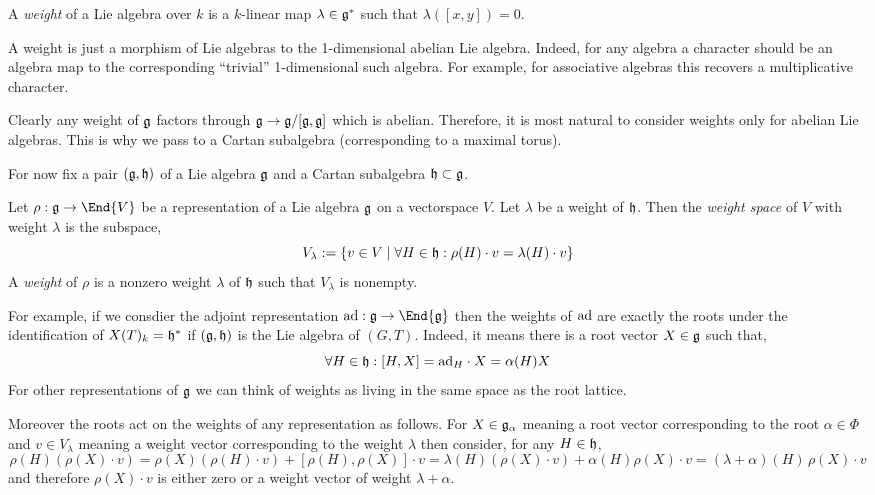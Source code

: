 \documentclass[12pt]{article}
\begin{document}
\begin{defn}
A \textit{weight} of a Lie algebra over $k$ is a $k$-linear map $\lambda \in \mathfrak{g}^*$ such that $\lambda([x,y]) = 0$. 
\end{defn}

\begin{rmk}
A weight is just a morphism of Lie algebras to the 1-dimensional abelian Lie algebra. Indeed, for any algebra a character should be an algebra map to the corresponding ``trivial'' 1-dimensional such algebra. For example, for associative algebras this recovers a multiplicative character.
\end{rmk}

\begin{rmk}
Clearly any weight of $\mathfrak{g}$ factors through $\mathfrak{g} \to \mathfrak{g} / [\mathfrak{g}, \mathfrak{g}]$ which is abelian. Therefore, it is most natural to consider weights only for abelian Lie algebras. This is why we pass to a Cartan subalgebra (corresponding to a maximal torus). 
\end{rmk}

For now fix a pair $(\mathfrak{g}, \mathfrak{h})$ of a Lie algebra $\mathfrak{g}$ and a Cartan subalgebra $\mathfrak{h} \subset \mathfrak{g}$.

\begin{defn}
Let $\rho : \g \to \End{V}$ be a representation of a Lie algebra $\mathfrak{g}$ on a vectorspace $V$. Let $\lambda$ be a weight of $\mathfrak{h}$. Then the \textit{weight space} of $V$ with weight $\lambda$ is the subspace,
\[ V_\lambda := \{ v \in V \mid \forall H \in \mathfrak{h} : \rho(H) \cdot v = \lambda(H) \cdot v \} \]
A \textit{weight} of $\rho$ is a nonzero weight $\lambda$ of $\mathfrak{h}$ such that $V_{\lambda}$ is nonempty.
\end{defn}

For example, if we consdier the adjoint representation $\ad : \g \to \End{\g}$ then the weights of $\mathrm{ad}$ are exactly the roots under the identification of $X(T)_k = \mathfrak{h}^*$ if $(\mathfrak{g}, \mathfrak{h})$ is the Lie algebra of $(G, T)$. Indeed, it means there is a root vector $X \in \mathfrak{g}$ such that,
\[ \forall H \in \mathfrak{h} : [H, X] = \mathrm{ad}_{H} \cdot X = \alpha(H) X \]
For other representations of $\mathfrak{g}$ we can think of weights as living in the same space as the root lattice. 

\begin{rmk}
Moreover the roots act on the weights of any representation as follows. For $X \in \mathfrak{g}_\alpha$ meaning a root vector corresponding to the root $\alpha \in \Phi$ and $v \in V_\lambda$ meaning a weight vector corresponding to the weight $\lambda$ then consider, for any $H \in \mathfrak{h}$,
\[ \rho(H)(\rho(X) \cdot v) = \rho(X) (\rho(H) \cdot v) + [\rho(H), \rho(X)] \cdot v = \lambda(H) (\rho(X) \cdot v) + \alpha(H) \rho(X) \cdot v = (\lambda + \alpha)(H) \, \rho(X) \cdot v \]
and therefore $\rho(X) \cdot v$ is either zero or a weight vector of weight $\lambda + \alpha$.
\end{rmk}
\end{document}
